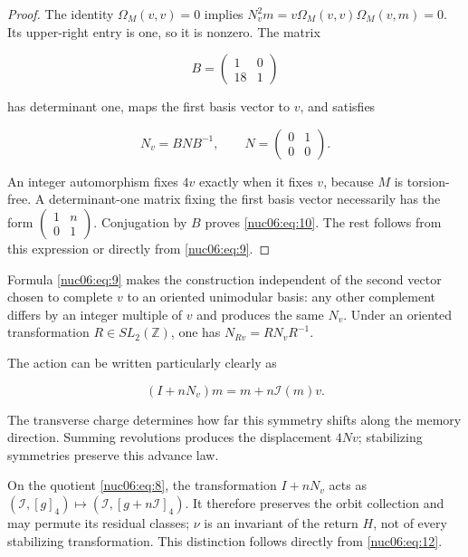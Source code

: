 \begin{proof}
The identity \(\Omega_M(v,v)=0\) implies \(N_v^2m=v\Omega_M(v,v)\Omega_M(v,m)=0\). Its upper-right entry is one, so it is nonzero. The matrix

\[
B=\begin{pmatrix}1&0\\18&1\end{pmatrix}
\]

has determinant one, maps the first basis vector to \(v\), and satisfies

\begin{equation}
N_v=BNB^{-1},\qquad N=\begin{pmatrix}0&1\\0&0\end{pmatrix}.
\label{nuc06:eq:11}
\end{equation}

An integer automorphism fixes \(4v\) exactly when it fixes \(v\), because \(M\) is torsion-free. A determinant-one matrix fixing the first basis vector necessarily has the form \(\begin{pmatrix}1&n\\0&1\end{pmatrix}\). Conjugation by \(B\) proves \eqref{nuc06:eq:10}. The rest follows from this expression or directly from \eqref{nuc06:eq:9}.
\end{proof}

Formula \eqref{nuc06:eq:9} makes the construction independent of the second vector chosen to complete \(v\) to an oriented unimodular basis: any other complement differs by an integer multiple of \(v\) and produces the same \(N_v\). Under an oriented transformation \(R\in SL_2(\mathbb Z)\), one has \(N_{Rv}=RN_vR^{-1}\).

The action can be written particularly clearly as

\begin{equation}
(I+nN_v)m=m+n\mathcal I(m)v.
\label{nuc06:eq:12}
\end{equation}

The transverse charge determines how far this symmetry shifts along the memory direction. Summing revolutions produces the displacement \(4Nv\); stabilizing symmetries preserve this advance law.

On the quotient \eqref{nuc06:eq:8}, the transformation \(I+nN_v\) acts as \((\mathcal I,[g]_4)\mapsto(\mathcal I,[g+n\mathcal I]_4)\). It therefore preserves the orbit collection and may permute its residual classes; \(\nu\) is an invariant of the return \(H\), not of every stabilizing transformation. This distinction follows directly from \eqref{nuc06:eq:12}.

